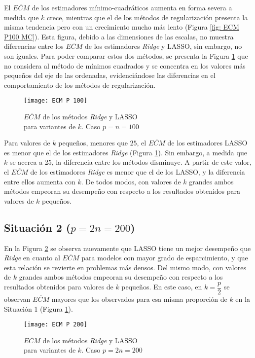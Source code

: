 \documentclass[a4paper,12pt]{report}
\begin{document}
El $\overline{ECM}$ de los estimadores mínimo-cuadráticos aumenta en forma severa a medida que $k$ crece, mientras que el de los métodos de regularización presenta la misma tendencia pero con un crecimiento mucho más lento (Figura \ref{fig: ECM P100 MC}). Esta figura, debido a las dimensiones de las escalas, no muestra diferencias entre los $\overline{ECM}$ de los estimadores \textit{Ridge} y LASSO, sin embargo, no son iguales. Para poder comparar estos dos métodos, se presenta la Figura \ref{fig: ECM P100} que no considera al método de mínimos cuadrados y se concentra en los valores más pequeños del eje de las ordenadas, evidenciándose las diferencias en el comportamiento de los métodos de regularización.

\begin{figure}[H]
	\centering
	\texttt{[image: ECM P 100]}
	\caption{$\overline{ECM}$ de los métodos \textit{Ridge} y LASSO \\ para variantes de $k$. Caso $p=n=100$}
	\label{fig: ECM P100}
\end{figure}

Para valores de $k$ pequeños, menores que $25$, el $\overline{ECM}$ de los estimadores LASSO es menor que el de los estimadores \textit{Ridge} (Figura \ref{fig: ECM P100}). Sin embargo, a medida que $k$ se acerca a 25, la diferencia entre los métodos disminuye. A partir de este valor, el $\overline{ECM}$ de los estimadores \textit{Ridge} es menor que el de los LASSO, y la diferencia entre ellos aumenta con $k$. De todos modos, con valores de $k$ grandes ambos métodos empeoran su desempeño con respecto a los resultados obtenidos para valores de $k$ pequeños.

\subsection*{Situación 2 ($p=2n=200$)}
En la Figura \ref{fig: ECM P200} se observa nuevamente que LASSO tiene un mejor desempeño que \textit{Ridge} en cuanto al $\overline{ECM}$ para modelos con mayor grado de esparcimiento, y que esta relación se revierte en problemas más densos. Del mismo modo, con valores de $k$ grandes ambos métodos empeoran su desempeño con respecto a los resultados obtenidos para valores de $k$ pequeños. En este caso, en $k=\dfrac{p}{2}$ se observan $\overline{ECM}$ mayores que los observados para esa misma proporción de $k$ en la Situación 1 (Figura \ref{fig: ECM P100}). 

\begin{figure}[H]
	\centering
	\texttt{[image: ECM P 200]}
	\caption{$\overline{ECM}$ de los métodos \textit{Ridge} y LASSO \\ para variantes de $k$. Caso $p=2n=200$}
	\label{fig: ECM P200}
\end{figure}
\end{document}
